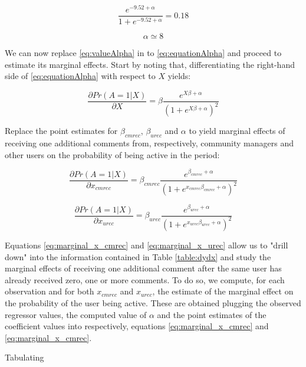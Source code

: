 \begin{equation}
	\frac{e^{-9.52 + \alpha}}{1 + e^{-9.52 + \alpha}} = 0.18
\end{equation}

\begin{equation}
	\alpha \simeq 8
	\label{eq:valueAlpha}
\end{equation}

We can now replace \ref{eq:valueAlpha} in to \ref{eq:equationAlpha} and proceed to estimate its marginal effects. Start by noting that, differentiating the right-hand side of \ref{eq:equationAlpha} with respect to $X$ yields:

\begin{equation}
	\frac{\partial Pr(A=1|X)}{\partial X} = \beta \frac{e^{X \beta + \alpha}}{(1 + e^{X \beta + \alpha})^2} 
\end{equation}

Replace the point estimates for $\beta_{cmrec}$, $\beta_{urec}$ and $\alpha$ to yield marginal effects of receiving one additional comments from, respectively, community managers and other users on the probability of being active in the period: 

\begin{equation}
	\frac{\partial Pr(A=1|X)}{\partial x_{cmrec}} = \beta_{cmrec} \frac{e^{ \beta_{cmrec} + \alpha}}{(1 + e^{x_{cmrec} \beta_{cmrec} + \alpha})^2} 
	\label{eq:marginal_x_cmrec}
\end{equation}

\begin{equation}
	\frac{\partial Pr(A=1|X)}{\partial x_{urec}} = \beta_{urec} \frac{e^{ \beta_{urec} + \alpha}}{(1 + e^{x_{urec} \beta_{urec} + \alpha})^2} 
	\label{eq:marginal_x_urec}
\end{equation}

Equations \ref{eq:marginal_x_cmrec} and \ref{eq:marginal_x_urec} allow us to "drill down" into the information contained in Table \ref{table:dydx} and study the marginal effects of receiving one additional comment after the same user has already received zero, one or more comments. To do so, we compute, for each observation and for both $x_{cmrec}$ and $x_{urec}$, the estimate of the marginal effect on the probability of the user being active. These are obtained plugging the observed regressor values, the computed value of $\alpha$ and the point estimates of the coefficient values into respectively, equations \ref{eq:marginal_x_cmrec} and \ref{eq:marginal_x_cmrec}. 

Tabulating 



